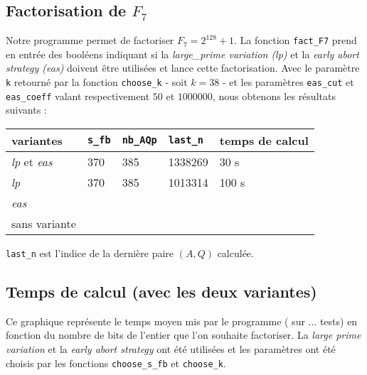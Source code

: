 \subsection{Factorisation de $F_7$}

Notre programme permet de factoriser $F_7 = 2^{128} + 1$. La fonction 
\texttt{fact\_F7} prend en entrée des booléens indiquant si la
\textit{large\_prime variation (lp)} et la \textit{early abort strategy (eas)}
doivent être utilisées et lance cette factorisation. Avec le paramètre \texttt{k}
retourné par la fonction \texttt{choose\_k} - soit $k=38$ - et les paramètres 
\texttt{eas\_cut} et \texttt{eas\_coeff} valant respectivement $50$ et $1000000$,
nous obtenons les résultats suivants :  

\begin{center}
     \begin{tabular}{| l | l| l | l | l |}
     \hline
     variantes                    & \texttt{s\_fb} & \texttt{nb\_AQp} & \texttt{last\_n} & temps de calcul  \\ \hline
     \textit{lp} et \textit{eas}  &     370        &  385             &    1338269       &     30 s         \\ \hline
     \textit{lp}                  &     370        &  385             &    1013314       &   100 s          \\ \hline
     \textit{eas}                 &                &                  &                  &                  \\ \hline
     sans variante                &                &                  &                  &                  \\ \hline
    \end{tabular}
\end{center}

\hspace*{1.6 cm} \footnotesize{\texttt{last\_n} est l'indice de la dernière paire $(A,Q)$
calculée.}

\subsection{Temps de calcul (avec les deux variantes) }

Ce graphique représente le temps moyen mis par le programme ( sur ... tests)
en fonction du nombre de bits de l'entier que l'on souhaite factoriser. La
\textit{large prime variation} et la \textit{early abort strategy} ont été 
utilisées et les paramètres ont été choisis par les fonctions 
\texttt{choose\_s\_fb} et \texttt{choose\_k}.\\


